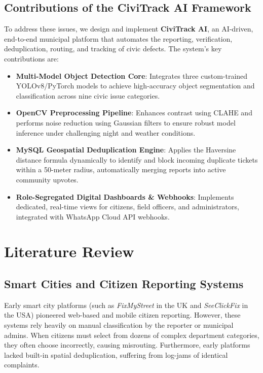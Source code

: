 \documentclass[journal]{IEEEtran}
\begin{document}
\subsection{Contributions of the CiviTrack AI Framework}
To address these issues, we design and implement \textbf{CiviTrack AI}, an AI-driven, end-to-end municipal platform that automates the reporting, verification, deduplication, routing, and tracking of civic defects. The system's key contributions are:
\begin{itemize}
    \item \textbf{Multi-Model Object Detection Core}: Integrates three custom-trained YOLOv8/PyTorch models to achieve high-accuracy object segmentation and classification across nine civic issue categories.
    \item \textbf{OpenCV Preprocessing Pipeline}: Enhances contrast using CLAHE and performs noise reduction using Gaussian filters to ensure robust model inference under challenging night and weather conditions.
    \item \textbf{MySQL Geospatial Deduplication Engine}: Applies the Haversine distance formula dynamically to identify and block incoming duplicate tickets within a 50-meter radius, automatically merging reports into active community upvotes.
    \item \textbf{Role-Segregated Digital Dashboards & Webhooks}: Implements dedicated, real-time views for citizens, field officers, and administrators, integrated with WhatsApp Cloud API webhooks.
\end{itemize}

\section{Literature Review}

\subsection{Smart Cities and Citizen Reporting Systems}
Early smart city platforms (such as \textit{FixMyStreet} in the UK and \textit{SeeClickFix} in the USA) pioneered web-based and mobile citizen reporting. However, these systems rely heavily on manual classification by the reporter or municipal admins. When citizens must select from dozens of complex department categories, they often choose incorrectly, causing misrouting. Furthermore, early platforms lacked built-in spatial deduplication, suffering from log-jams of identical complaints.
\end{document}
